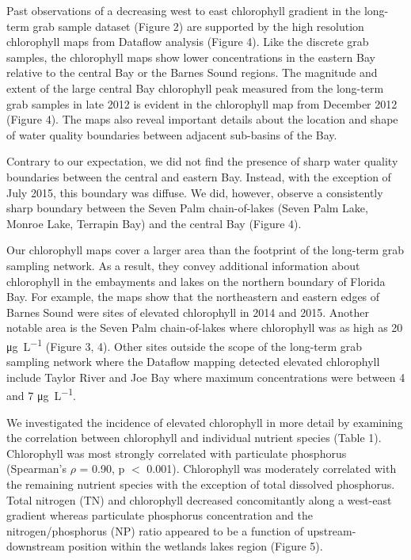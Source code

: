 Past observations of a decreasing west to east chlorophyll gradient in the long-term grab sample dataset (Figure 2) are supported by the high resolution chlorophyll maps from Dataflow analysis (Figure 4). Like the discrete grab samples, the chlorophyll maps show lower concentrations in the eastern Bay relative to the central Bay or the Barnes Sound regions. The magnitude and extent of the large central Bay chlorophyll peak measured from the long-term grab samples in late 2012 is evident in the chlorophyll map from December 2012 (Figure 4). The maps also reveal important details about the location and shape of water quality boundaries between adjacent sub-basins of the Bay. 

Contrary to our expectation, we did not find the presence of sharp water quality boundaries between the central and eastern Bay. Instead, with the exception of July 2015, this boundary was diffuse. We did, however, observe a consistently sharp boundary between the Seven Palm chain-of-lakes (Seven Palm Lake, Monroe Lake, Terrapin Bay) and the central Bay (Figure 4). 

Our chlorophyll maps cover a larger area than the footprint of the long-term grab sampling network. As a result, they convey additional information about chlorophyll in the embayments and lakes on the northern boundary of Florida Bay. For example, the maps show that the northeastern and eastern edges of Barnes Sound were sites of elevated chlorophyll in 2014 and 2015. Another notable area is the Seven Palm chain-of-lakes where chlorophyll was as high as 20 \si{\micro\gram\per\liter} (Figure 3, 4). Other sites outside the scope of the long-term grab sampling network where the Dataflow mapping detected elevated chlorophyll include Taylor River and Joe Bay where maximum concentrations were between 4 and 7 \si{\micro\gram\per\liter}. 

We investigated the incidence of elevated chlorophyll in more detail by examining the correlation between chlorophyll and individual nutrient species (Table 1). Chlorophyll was most strongly correlated with particulate phosphorus (Spearman's $\rho$ = 0.90, p $<$ 0.001). Chlorophyll was moderately correlated with the remaining nutrient species with the exception of total dissolved phosphorus. Total nitrogen (TN) and chlorophyll decreased concomitantly along a west-east gradient whereas particulate phosphorus concentration and the nitrogen/phosphorus (NP) ratio appeared to be a function of upstream-downstream position within the wetlands lakes region (Figure 5).  

